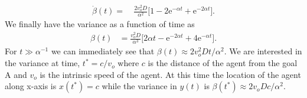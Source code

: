 \documentclass[12pt]{article}
\def\e{\text{e}}
\def\yd{\dot{y}}
\begin{document}
\begin{align}
    \dot{\beta}(t) = & \  \frac{2 v_o^2 D}{\alpha^2} \bigg[ 1 - 2 \e^{-\alpha t} + \e^{-2 \alpha t}\bigg].
\end{align}
We finally have the variance as a function of time as
\begin{align}
    \beta(t) & = \frac{v_o^2 D}{\alpha^3} \bigg[ 2 \alpha t - \e^{-2 \alpha t} + 4 \e^{-\alpha t} \bigg].
\end{align}
For $t \gg \alpha^{-1}$ we can immediately see that $\beta(t) \approx 2v_o^2 D t/\alpha^2$. We are interested
in the variance at time, $t^* = c/v_o$ where $c$ is the distance of the agent from the goal A and $v_o$
is the intrinsic speed of the agent. At this time the location of the agent along x-axis is $x(t^*)=c$
while the variance in $y(t)$ is $\beta(t^*) \approx 2v_o D c/\alpha^2$.
\end{document}
